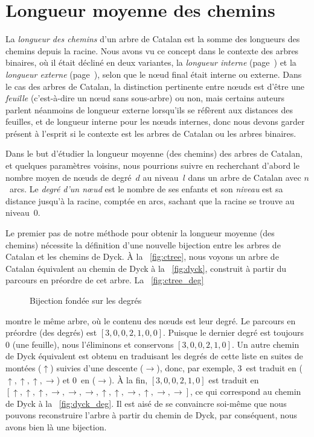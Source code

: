 \section{Longueur moyenne des chemins}

La \emph{longueur des chemins} d'un arbre de Catalan est la somme des
longueurs des chemins depuis la racine. Nous avons vu ce concept dans
le contexte des arbres binaires, où il était décliné en deux
variantes, la \emph{longueur interne}
(page~\pageref{insertion__internal_path_length}) et la \emph{longueur
externe} (page~\pageref{sorting__external_path_length}), selon que le
nœud final était interne ou externe. Dans le cas des arbres de
Catalan, la distinction pertinente entre nœuds est d'être une
\emph{feuille} (c'est-à-dire un nœud sans sous-arbre) ou non, mais
certains auteurs parlent néanmoins de longueur externe lorsqu'ils se
réfèrent aux distances des feuilles, et de longueur interne pour les
nœuds internes, donc nous devons garder présent à l'esprit si le
contexte est les arbres de Catalan ou les arbres binaires.

Dans le but d'étudier la longueur moyenne (des chemins) des arbres de
Catalan, et quelques paramètres voisins, nous pourrions suivre
\cite{DershowitzZaks_1981} en recherchant d'abord le nombre moyen de
nœuds de degré~\(d\) au niveau~\(l\) dans un arbre de Catalan
avec \(n\)~arcs. Le \emph{degré d'un nœud} est le nombre de ses
enfants et son \emph{niveau} est sa distance jusqu'à la racine,
comptée en arcs, sachant que la racine se trouve au niveau~\(0\).

Le premier pas de notre méthode pour obtenir la longueur moyenne (des
chemins) nécessite la définition d'une nouvelle bijection entre les
arbres de Catalan et les chemins de Dyck. À la \fig~\vref{fig:ctree},
nous voyons un arbre de Catalan équivalent au chemin de Dyck à la
\fig~\ref{fig:dyck}, construit à partir du parcours en préordre de cet
arbre. La \fig~\ref{fig:ctree_deg}
\begin{figure}
\centering
{}
\qquad
{}
\caption{Bijection fondée sur les degrés}
\label{fig:degree_based_bijection}
\end{figure}
montre le même arbre, où le contenu des nœuds est leur degré. Le
parcours en préordre (des degrés) est \([3,0,0,2,1,0,0]\). Puisque le
dernier degré est toujours~\(0\) (une feuille), nous l'éliminons et
conservons \([3,0,0,2,1,0]\). Un autre chemin de Dyck équivalent est
obtenu en traduisant les degrés de cette liste en suites de montées
(\(\uparrow\)) suivies d'une descente (\(\rightarrow\)), donc, par
exemple, \(3\)~est traduit en (\(\uparrow, \uparrow, \uparrow,
\rightarrow\)) et \(0\)~en (\(\rightarrow\)). À la fin,
\([3,0,0,2,1,0]\) est traduit en \([\uparrow, \uparrow, \uparrow,
\rightarrow, \rightarrow, \rightarrow, \uparrow, \uparrow,
\rightarrow, \uparrow, \rightarrow, \rightarrow]\), ce qui correspond
au chemin de Dyck à la \fig~\ref{fig:dyck_deg}. Il est aisé de se
convaincre soi-même que nous pouvons reconstruire l'arbre à partir du
chemin de Dyck, par conséquent, nous avons bien là une bijection.

